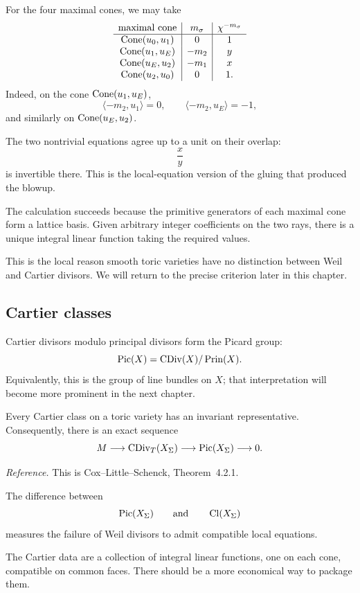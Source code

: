 For the four maximal cones, we may take
\[
\begin{array}{c|c|c}
\text{maximal cone}
&
m_\sigma
&
\chi^{-m_\sigma}
\\
\hline
\operatorname{Cone}(u_0,u_1)
&
0
&
1
\\
\operatorname{Cone}(u_1,u_E)
&
-m_2
&
y
\\
\operatorname{Cone}(u_E,u_2)
&
-m_1
&
x
\\
\operatorname{Cone}(u_2,u_0)
&
0
&
1.
\end{array}
\]
Indeed, on the cone \(\operatorname{Cone}(u_1,u_E)\),
\[
\langle -m_2,u_1\rangle=0,
\qquad
\langle -m_2,u_E\rangle=-1,
\]
and similarly on \(\operatorname{Cone}(u_E,u_2)\).

The two nontrivial equations agree up to a unit on their overlap:
\[
\frac{x}{y}
\]
is invertible there. This is the local-equation version of the gluing
that produced the blowup.

\begin{observation}
The calculation succeeds because the primitive generators of each
maximal cone form a lattice basis. Given arbitrary integer
coefficients on the two rays, there is a unique integral linear
function taking the required values.

This is the local reason smooth toric varieties have no distinction
between Weil and Cartier divisors. We will return to the precise
criterion later in this chapter.
\end{observation}

\subsection{Cartier classes}

Cartier divisors modulo principal divisors form the Picard group:
\[
\operatorname{Pic}(X)
=
\operatorname{CDiv}(X)/
\operatorname{Prin}(X).
\]
Equivalently, this is the group of line bundles on \(X\); that
interpretation will become more prominent in the next chapter.

Every Cartier class on a toric variety has an invariant
representative. Consequently, there is an exact sequence
\[
M
\longrightarrow
\operatorname{CDiv}_T(X_\Sigma)
\longrightarrow
\operatorname{Pic}(X_\Sigma)
\longrightarrow
0.
\]

\noindent
\textit{Reference.}
This is Cox--Little--Schenck, Theorem~4.2.1.

The difference between
\[
\operatorname{Pic}(X_\Sigma)
\qquad\text{and}\qquad
\operatorname{Cl}(X_\Sigma)
\]
measures the failure of Weil divisors to admit compatible local
equations.

The Cartier data are a collection of integral linear functions, one
on each cone, compatible on common faces. There should be a more
economical way to package them.

